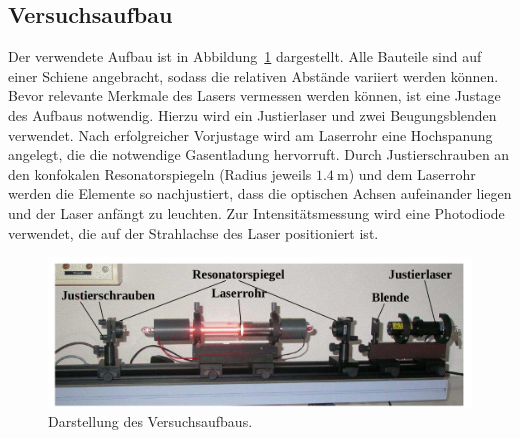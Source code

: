 \subsection{Versuchsaufbau}
\label{sec:Versuchsaufbau}

Der verwendete Aufbau ist in Abbildung~\ref{fig:aufbau} dargestellt. Alle Bauteile sind auf einer Schiene angebracht, sodass die
relativen Abstände variiert werden können. Bevor relevante Merkmale des Lasers vermessen werden können, ist eine
Justage des Aufbaus notwendig. Hierzu wird ein Justierlaser und zwei Beugungsblenden verwendet.
Nach erfolgreicher Vorjustage wird am Laserrohr eine Hochspanung
angelegt, die die notwendige Gasentladung hervorruft. Durch Justierschrauben an den konfokalen Resonatorspiegeln (Radius jeweils $\SI{1.4}{\meter}$)
und dem Laserrohr werden die Elemente so nachjustiert, dass die optischen Achsen aufeinander liegen und der Laser anfängt zu leuchten.
Zur Intensitätsmessung wird eine Photodiode verwendet, die auf der Strahlachse des Laser positioniert ist.
\begin{figure}
  \centering
  \includegraphics[width=0.99\columnwidth]{pictures/aufbau.png}
  \caption{Darstellung des Versuchsaufbaus.~\cite{Anleitung}}
  \label{fig:aufbau}
\end{figure}
